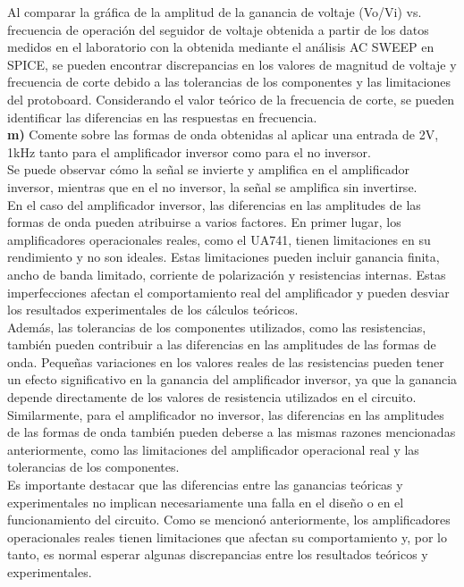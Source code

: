 \documentclass[12pt]{article}
\begin{document}
	Al comparar la gráfica de la amplitud de la ganancia de voltaje (Vo/Vi) vs. frecuencia de operación del seguidor de voltaje obtenida a partir de los datos medidos en el laboratorio con la obtenida mediante el análisis AC SWEEP en SPICE, se pueden encontrar discrepancias en los valores de magnitud de voltaje y frecuencia de corte debido a las tolerancias de los componentes y las limitaciones del protoboard. Considerando el valor teórico de la frecuencia de corte, se pueden identificar las diferencias en las respuestas en frecuencia.\\
	
	\noindent \textbf{m)} Comente sobre las formas de onda obtenidas al aplicar una entrada de 2V, 1kHz tanto para el amplificador inversor como para el no inversor.\\
	
	Se puede observar cómo la señal se invierte y amplifica en el amplificador inversor, mientras que en el no inversor, la señal se amplifica sin invertirse.\\
	
	En el caso del amplificador inversor, las diferencias en las amplitudes de las formas de onda pueden atribuirse a varios factores. En primer lugar, los amplificadores operacionales reales, como el UA741, tienen limitaciones en su rendimiento y no son ideales. Estas limitaciones pueden incluir ganancia finita, ancho de banda limitado, corriente de polarización y resistencias internas. Estas imperfecciones afectan el comportamiento real del amplificador y pueden desviar los resultados experimentales de los cálculos teóricos.\\
	
	Además, las tolerancias de los componentes utilizados, como las resistencias, también pueden contribuir a las diferencias en las amplitudes de las formas de onda. Pequeñas variaciones en los valores reales de las resistencias pueden tener un efecto significativo en la ganancia del amplificador inversor, ya que la ganancia depende directamente de los valores de resistencia utilizados en el circuito.\\
	
	Similarmente, para el amplificador no inversor, las diferencias en las amplitudes de las formas de onda también pueden deberse a las mismas razones mencionadas anteriormente, como las limitaciones del amplificador operacional real y las tolerancias de los componentes.\\
	
	Es importante destacar que las diferencias entre las ganancias teóricas y experimentales no implican necesariamente una falla en el diseño o en el funcionamiento del circuito. Como se mencionó anteriormente, los amplificadores operacionales reales tienen limitaciones que afectan su comportamiento y, por lo tanto, es normal esperar algunas discrepancias entre los resultados teóricos y experimentales.\\
	
\end{document}
